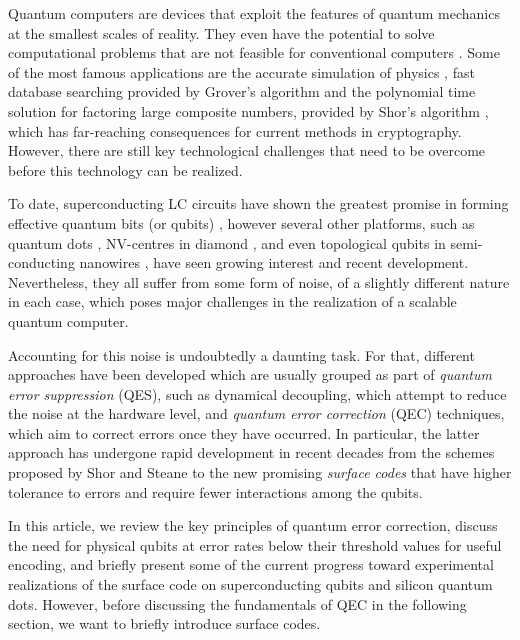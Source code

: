 Quantum computers are devices that exploit the features of quantum mechanics at
the smallest scales of reality. They even have the potential to solve
computational problems that are not feasible for conventional computers
\cite{nielsen_chuang_2010}. Some of the most famous applications are the
accurate simulation of physics \cite{feynman82_simul_physic_with_comput}, fast
database searching provided by Grover's algorithm \cite{Grover_1996} and the
polynomial time solution for factoring large composite numbers, provided by
Shor's algorithm \cite{Shor_1997}, which has far-reaching consequences for
current methods in cryptography. However, there are still key technological
challenges that need to be overcome before this technology can be realized.

To date, superconducting LC circuits have shown the greatest promise in forming
effective quantum bits (or qubits) \cite{Rol_2019}
\cite{barends14_super_quant_circuit_at_surfac}, however several other platforms,
such as quantum dots \cite{huang19_fidel_bench_two_qubit_gates_silic}
\cite{Lawrie_2020}, NV-centres in diamond \cite{Taminiau_2014}, and even
topological qubits in semi-conducting nanowires \cite{Mourik_2012}, have seen
growing interest and recent development. Nevertheless, they all suffer from some
form of noise, of a slightly different nature in each case, which poses
major challenges in the realization of a scalable quantum computer.

Accounting for this noise is undoubtedly a daunting task. For that, different
approaches have been developed which are usually grouped as part of
\textit{quantum error suppression} (QES), such as dynamical decoupling, which
attempt to reduce the noise at the hardware level, and \textit{quantum error
  correction} (QEC) techniques, which aim to correct errors once they have
occurred. In particular, the latter approach has undergone rapid development in
recent decades from the schemes proposed by Shor \cite{Shor_1995_QEC} and Steane
\cite{Steane_1996_QEC} to the new promising \textit{surface codes}
\cite{fowler12_surfac_codes} that have higher tolerance to errors and require
fewer interactions among the qubits.

In this article, we review the key principles of quantum error correction,
discuss the need for physical qubits at error rates below their threshold values
for useful encoding, and briefly present some of the current progress toward
experimental realizations of the surface code on superconducting qubits and
silicon quantum dots. However, before discussing the fundamentals of QEC in the
following section, we want to briefly introduce surface codes.

